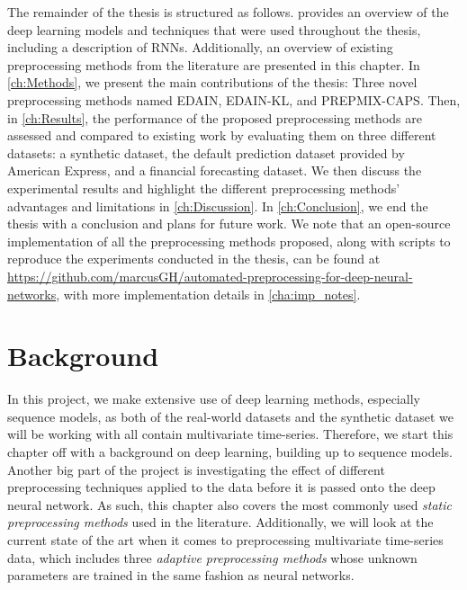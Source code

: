 \documentclass{statsmsc}
\begin{document}
{%
The remainder of the thesis is structured as follows. 
provides an overview of the deep learning models and techniques that were used
throughout the thesis, including a description of \acp{RNN}.
Additionally, an overview of existing preprocessing
methods from the literature are presented in this chapter. In
\cref{ch:Methods}, we present the main contributions of the thesis: Three novel
preprocessing methods named \acs{EDAIN}, \acs{EDAIN-KL}, and \acs{PREPMIX-CAPS}.
Then, in \cref{ch:Results}, the performance of the
proposed preprocessing methods are assessed and compared to existing work by
evaluating them on three different datasets: a synthetic dataset, the default
prediction dataset provided by American Express, and a financial forecasting
dataset. We then discuss the experimental results and highlight the different
preprocessing methods' advantages and limitations in \cref{ch:Discussion}.  In
\cref{ch:Conclusion}, we end the thesis with a conclusion and plans for future
work.
We note that an open-source implementation of all the preprocessing methods proposed,
along with scripts
to reproduce the experiments conducted in the thesis, can be found at
\url{https://github.com/marcusGH/automated-preprocessing-for-deep-neural-networks}, with
more implementation details in \cref{cha:imp_notes}.


\chapter{Background} %
\label{ch:Background}


In this project, we make extensive use of deep learning methods, especially sequence models, as
both of the real-world datasets and the synthetic dataset we will be working with all contain
multivariate time-series.  Therefore, we start this chapter off with a background on deep
learning, building up to sequence models.
Another big part of the project is investigating the effect of different
preprocessing techniques applied to the data before it is passed onto the deep neural network.
As such, this chapter also covers the most commonly used \textit{static preprocessing methods} used
in the literature. Additionally, we will look at the current state of the art when it comes
to preprocessing multivariate time-series data, which includes three
\textit{adaptive preprocessing methods} whose unknown parameters are trained in the same
fashion as neural networks.

}
\end{document}

